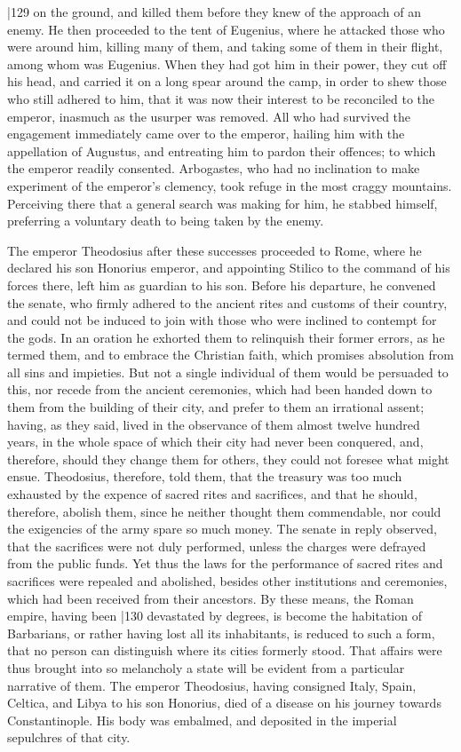 |129 on the ground, and killed them before they knew of the approach of an enemy. He then proceeded to the tent of Eugenius, where he attacked those who were around him, killing many of them, and taking some of them in their flight, among whom was Eugenius. When they had got him in their power, they cut off his head, and carried it on a long spear around the camp, in order to shew those who still adhered to him, that it was now their interest to be reconciled to the emperor, inasmuch as the usurper was removed. All who had survived the engagement immediately came over to the emperor, hailing him with the appellation of Augustus, and entreating him to pardon their offences; to which the emperor readily consented. Arbogastes, who had
no inclination to make experiment of the emperor's clemency, took refuge in the most craggy mountains. Perceiving there that a general search was making for him, he stabbed himself, preferring a voluntary death to being taken by the enemy.

The emperor Theodosius after these successes proceeded to Rome, where he declared his son Honorius emperor, and appointing Stilico to the command of his forces there, left him as guardian to his son. Before his departure, he convened the senate, who firmly adhered to the ancient rites and customs of their country, and could not be induced to join with those who were inclined to contempt for the gods. In an oration he exhorted them to relinquish their former errors, as he termed them, and to embrace the Christian faith, which promises absolution from all sins and impieties. But not a single individual of them would be persuaded to this, nor recede from the ancient ceremonies, which had been handed down to them from the building of their city, and prefer to them an irrational assent; having, as they said, lived in the observance of them almost twelve hundred years, in the whole space of which their city had never been conquered, and, therefore, should they change them for others, they could not foresee what might ensue. Theodosius, therefore, told them, that the treasury was too much exhausted by the expence of sacred rites and sacrifices, and that he should, therefore, abolish them, since he neither thought them commendable, nor could the exigencies of the army spare so much money. The senate in reply observed, that the sacrifices were not duly performed, unless the charges were defrayed from the public funds. Yet thus the laws for the performance of sacred rites and sacrifices were repealed and abolished, besides other institutions and ceremonies, which had been received from their ancestors. By these means, the Roman empire, having been
|130
devastated by degrees, is become the habitation of Barbarians, or rather having lost all its inhabitants, is reduced to such a form, that no person can distinguish where its cities formerly stood. That affairs were thus brought into so melancholy a state will be evident from a particular narrative of them. The emperor Theodosius, having consigned Italy, Spain, Celtica, and Libya to his son Honorius, died of a disease on his journey towards Constantinople. His body was embalmed, and deposited in the imperial sepulchres of that city.

